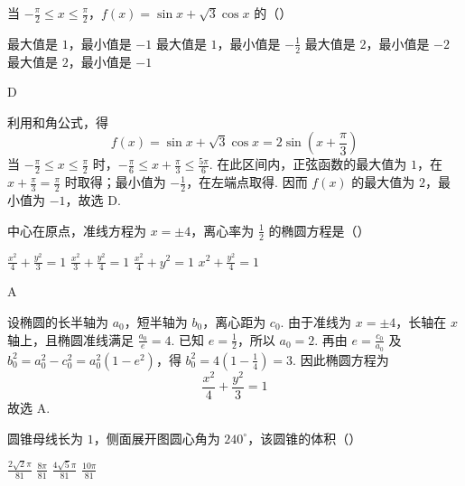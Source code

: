 \documentclass[UTF8,a4paper,oneside,11pt]{ctexbook}
\begin{document}
\begin{problem}
当 \(-\frac{\pi}{2} \leqslant x \leqslant \frac{\pi}{2}\)，\(f(x) = \sin x + \sqrt{3} \cos x\) 的（\quad）

\choices
    {最大值是 \(1\)，最小值是 \(-1\)}
    {最大值是 \(1\)，最小值是 \(-\frac{1}{2} \)}
    {最大值是 \(2\)，最小值是 \(-2\)}
    {最大值是 \(2\)，最小值是 \(-1\)}
\end{problem}

\begin{answer}
D
\end{answer}

\begin{solution}
利用和角公式，得
\[
f(x)=\sin x+\sqrt{3}\cos x=2\sin\left(x+\frac{\pi}{3}\right)
\]
当 \(-\frac{\pi}{2}\leqslant x\leqslant\frac{\pi}{2}\) 时，\(-\frac{\pi}{6}\leqslant x+\frac{\pi}{3}\leqslant\frac{5\pi}{6}\). 在此区间内，正弦函数的最大值为 \(1\)，在 \(x+\frac{\pi}{3}=\frac{\pi}{2}\) 时取得；最小值为 \(-\frac{1}{2}\)，在左端点取得. 因而 \(f(x)\) 的最大值为 \(2\)，最小值为 \(-1\)，故选 D.
\end{solution}

\begin{problem}
中心在原点，准线方程为 \(x = \pm 4\)，离心率为 \(\frac{1}{2}\) 的椭圆方程是（\quad）

\choices
    {\(\frac{x^2}{4} +\frac{y^2}{3} = 1\)}
    {\(\frac{x^2}{3} +\frac{y^2}{4} = 1\)}
    {\(\frac{x^2}{4} + y^2 = 1\)}
    {\(x^2 + \frac{y^2}{4} = 1\)}
\end{problem}

\begin{answer}
A
\end{answer}

\begin{solution}
设椭圆的长半轴为 \(a_0\)，短半轴为 \(b_0\)，离心距为 \(c_0\). 由于准线为 \(x=\pm4\)，长轴在 \(x\) 轴上，且椭圆准线满足 \(\frac{a_0}{e}=4\). 已知 \(e=\frac12\)，所以 \(a_0=2\). 再由 \(e=\frac{c_0}{a_0}\) 及 \(b_0^2=a_0^2-c_0^2=a_0^2(1-e^2)\)，得 \(b_0^2=4\left(1-\frac14\right)=3\). 因此椭圆方程为
\[
\frac{x^2}{4}+\frac{y^2}{3}=1
\]
故选 A.
\end{solution}

\begin{problem}
圆锥母线长为 \(1\)，侧面展开图圆心角为 \(240^{\circ}\)，该圆锥的体积（\quad）

\choices
    {\(\frac{2\sqrt{2}\pi}{81}\)}
    {\(\frac{8\pi}{81}\)}
    {\(\frac{4\sqrt{5}\pi}{81}\)}
    {\(\frac{10\pi}{81}\)}
\end{problem}
\end{document}
